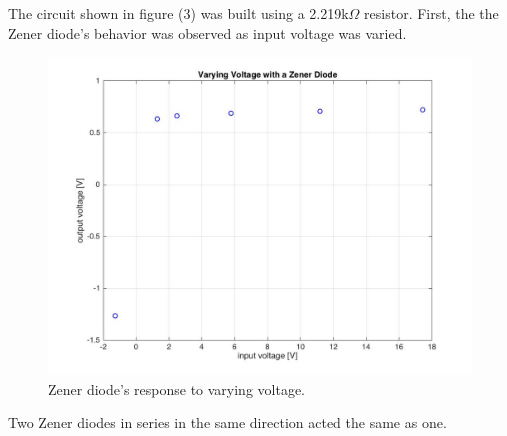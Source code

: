 \documentclass[twocolumn, amsmath]{revtex4}
\begin{document}
The circuit shown in figure (3) was built using a 2.219k$\Omega$ resistor. First, the the Zener diode's behavior was observed as input voltage was varied.
\begin{figure}[h]
    \includegraphics[scale=0.2]{zenerdiode_plot}  
    \caption{Zener diode's response to varying voltage.}
\end{figure}

Two Zener diodes in series in the same direction acted the same as one.
\end{document}
